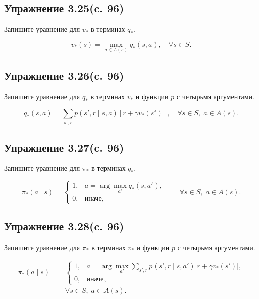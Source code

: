 \subsection{Упражнение 3.25(c. 96)}
Запишите уравнение для $v_*$ в терминах $q_*$. 
\begin{solution}
    \[
    v_*(s)=\max_{a \in A(s)} q_*(s,a), \quad \forall s\in S.
    \]
\end{solution}

\subsection{Упражнение 3.26(c. 96)}
Запишите уравнение для $q_*$ в терминах $v_*$ и функции $p$ с четырьмя аргументами. 
\begin{solution}
    \[
    q_*(s,a)
    =
    \sum_{s',r}
    p(s',r \mid s,a)
    \left[
    r + \gamma v_*(s')
    \right],
    \quad \forall s \in S,\; a \in A(s).
    \]
\end{solution}

\subsection{Упражнение 3.27(c. 96)}
Запишите уравнение для $\pi_*$ в терминах $q_*$. 
\begin{solution}
    \[
    \pi_*(a\mid s)=
    \begin{cases}
    1, & a = \arg\max\limits_{a'} q_*(s,a'),\\[4pt]
    0, & \text{иначе},
    \end{cases}
    \qquad \forall s\in S,\; a\in A(s).
    \]
\end{solution}

\subsection{Упражнение 3.28(c. 96)}
Запишите уравнение для $\pi_*$ в терминах $v_*$ и функции $p$ с четырьмя аргументами.
\begin{solution}
    \[
    \begin{aligned}
    \pi_*(a \mid s)=
    &\begin{cases}
    1, 
    & a = \displaystyle
    \arg\max_{a'} \sum_{s',r} p(s',r \mid s,a')
    \bigl[ r + \gamma v_*(s') \bigr],
    \\[10pt]
    0,
    & \text{иначе},
    \end{cases} \\
    &\forall s \in S,\; a \in A(s).
    \end{aligned}
    \]
\end{solution}

